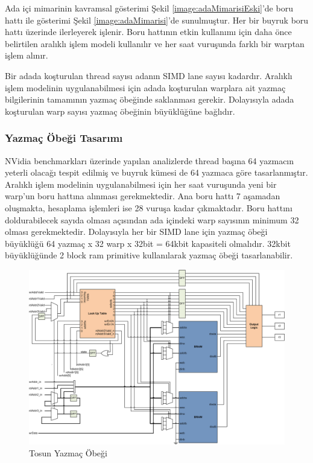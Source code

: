 Ada içi mimarinin kavramsal gösterimi Şekil \ref{image:adaMimarisiEski}'de boru hattı ile gösterimi Şekil \ref{image:adaMimarisi}'de sunulmuştur. Her bir buyruk boru hattı üzerinde ilerleyerek işlenir. Boru hattının etkin kullanımı için daha önce belirtilen aralıklı işlem modeli kullanılır ve her saat vuruşunda farklı bir warptan işlem alınır. \par
Bir adada koşturulan thread sayısı adanın SIMD lane sayısı kadardır. Aralıklı işlem modelinin uygulanabilmesi için adada koşturulan warplara ait yazmaç bilgilerinin tamamının yazmaç öbeğinde saklanması gerekir. Dolayısıyla adada koşturulan warp sayısı yazmaç öbeğinin büyüklüğüne bağlıdır.\par

\subsubsection{Yazmaç Öbeği Tasarımı}
NVidia benchmarkları üzerinde yapılan analizlerde thread başına 64 yazmacın yeterli olacağı tespit edilmiş ve buyruk kümesi de 64 yazmaca göre tasarlanmıştır. Aralıklı işlem modelinin uygulanabilmesi için her saat vuruşunda yeni bir warp'un boru hattına alınması gerekmektedir. Ana boru hattı 7 aşamadan oluşmakta, hesaplama işlemleri ise 28 vuruşa kadar çıkmaktadır. Boru hattını doldurabilecek sayıda olması açısından ada içindeki warp sayısının minimum 32 olması gerekmektedir. Dolayısıyla her bir SIMD lane için yazmaç öbeği büyüklüğü 64 yazmaç x 32 warp x 32bit = 64kbit kapasiteli olmalıdır. 32kbit büyüklüğünde 2 block ram primitive kullanılarak yazmaç öbeği tasarlanabilir.\par
\begin{figure}[h]
\centering
\shorthandoff{=}
\includegraphics[width=\textwidth]{gorsel/registerFile.png}
\shorthandoff{=}
\caption{Tosun Yazmaç Öbeği}
\label{image:registerFile}
\end{figure}
